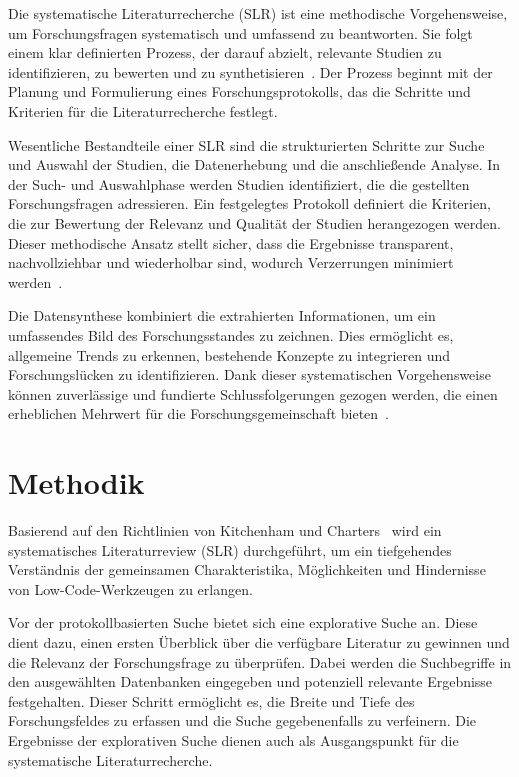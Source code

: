 Die systematische Literaturrecherche (SLR) ist eine methodische Vorgehensweise, um Forschungsfragen 
systematisch und umfassend zu beantworten. Sie folgt einem klar definierten Prozess, der darauf abzielt, 
relevante Studien zu identifizieren, zu bewerten und zu synthetisieren~\cite{kitchenham2007guidelines}. 
Der Prozess beginnt mit der Planung und Formulierung eines Forschungsprotokolls, das die Schritte und 
Kriterien für die Literaturrecherche festlegt.

Wesentliche Bestandteile einer SLR sind die strukturierten Schritte zur Suche und Auswahl der Studien, 
die Datenerhebung und die anschließende Analyse. In der Such- und Auswahlphase werden Studien identifiziert, 
die die gestellten Forschungsfragen adressieren. Ein festgelegtes Protokoll definiert die Kriterien, die 
zur Bewertung der Relevanz und Qualität der Studien herangezogen werden. Dieser methodische Ansatz stellt 
sicher, dass die Ergebnisse transparent, nachvollziehbar und wiederholbar sind, wodurch Verzerrungen 
minimiert werden~\cite{okoli2015guide}. 

Die Datensynthese kombiniert die extrahierten Informationen, um ein umfassendes Bild des Forschungsstandes 
zu zeichnen. Dies ermöglicht es, allgemeine Trends zu erkennen, bestehende Konzepte zu integrieren und 
Forschungslücken zu identifizieren. Dank dieser systematischen Vorgehensweise können zuverlässige und 
fundierte Schlussfolgerungen gezogen werden, die einen erheblichen Mehrwert für 
die Forschungsgemeinschaft bieten~\cite{petersen2008systematic}.

\section{Methodik}
Basierend auf den Richtlinien von Kitchenham und Charters~\cite{kitchenham2007guidelines} wird ein systematisches 
Literaturreview (SLR) durchgeführt, um ein tiefgehendes Verständnis der gemeinsamen Charakteristika, Möglichkeiten 
und Hindernisse von Low-Code-Werkzeugen zu erlangen.

Vor der protokollbasierten Suche bietet sich eine explorative Suche an. Diese dient dazu, einen ersten Überblick über die verfügbare Literatur zu gewinnen und 
die Relevanz der Forschungsfrage zu überprüfen. Dabei werden die Suchbegriffe in den ausgewählten 
Datenbanken eingegeben und potenziell relevante Ergebnisse festgehalten. Dieser Schritt ermöglicht es, 
die Breite und Tiefe des Forschungsfeldes zu erfassen und die Suche gegebenenfalls zu verfeinern. 
Die Ergebnisse der explorativen Suche dienen auch als Ausgangspunkt für die systematische Literaturrecherche. 

